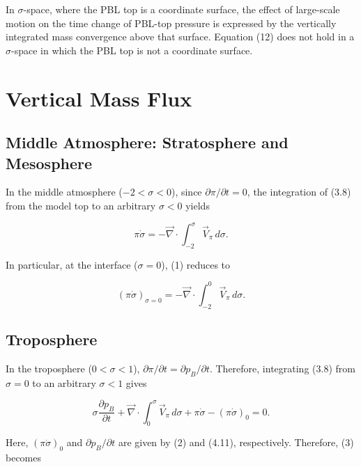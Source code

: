 \documentclass[12pt,openany]{book}
\begin{document}
In $\sigma$-space, where the PBL top is a coordinate surface, the effect of large-scale motion on the time change of PBL-top pressure is expressed by the vertically integrated mass convergence above that surface.  
Equation (12) does not hold in a $\sigma$-space in which the PBL top is not a coordinate surface.

\chapter{Vertical Mass Flux}

\section{Middle Atmosphere: Stratosphere and Mesosphere}

In the middle atmosphere ($-2 < \sigma < 0$), since
$\partial \pi / \partial t = 0$,
the integration of (3.8) from the model top to an arbitrary $\sigma < 0$ yields

\begin{equation}
\pi \dot{\sigma}
=
- \vec{\nabla} \cdot \int_{-2}^{\sigma} \vec{V}_{\pi} \, d\sigma .
\tag{5.1}
\label{eq:5.1}
\end{equation}

In particular, at the interface ($\sigma = 0$), (1) reduces to

\begin{equation}
(\pi \dot{\sigma})_{\sigma = 0}
=
- \vec{\nabla} \cdot \int_{-2}^{0} \vec{V}_{\pi} \, d\sigma .
\tag{5.2}
\label{eq:5.2}
\end{equation}

\section{Troposphere}

In the troposphere ($0 < \sigma < 1$),
$\partial \pi / \partial t = \partial p_B / \partial t$.
Therefore, integrating (3.8) from $\sigma = 0$ to an arbitrary $\sigma < 1$ gives

\begin{equation}
\sigma \frac{\partial p_B}{\partial t}
+
\vec{\nabla} \cdot \int_{0}^{\sigma} \vec{V}_{\pi} \, d\sigma
+
\pi \dot{\sigma}
-
(\pi \dot{\sigma})_{0}
=
0 .
\tag{5.3}
\label{eq:5.3}
\end{equation}

Here, $(\pi \dot{\sigma})_{0}$ and $\partial p_B / \partial t$
are given by (2) and (4.11), respectively.
Therefore, (3) becomes
\end{document}
